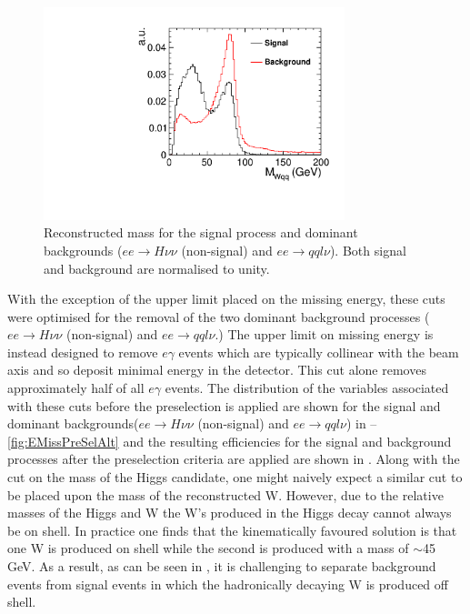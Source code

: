 \begin{figure}
  \centering
  \includegraphics[width=0.78\textwidth,keepaspectratio]{HiggsAnalysis/figures/MWqq_PreSelection}
  \caption[Reconstructed W mass for signal and background events]{Reconstructed mass for the signal process and dominant backgrounds ($ee\rightarrow H\nu\nu$ (non-signal) and $ee\rightarrow qql\nu$). Both signal and background are normalised to unity.}
  \label{fig:WMass}
\end{figure}


With the exception of the upper limit placed on the missing energy, these cuts were optimised for the removal of the two dominant background processes ($ee\rightarrow H\nu\nu$ (non-signal) and $ee\rightarrow qql\nu$.) The upper limit on missing energy is instead designed to remove $e\gamma$ events which are typically collinear with the beam axis and so deposit minimal energy in the detector. This cut alone removes approximately half of all $e\gamma$ events. The distribution of the variables associated with these cuts before the preselection is applied are shown for the signal and dominant backgrounds($ee\rightarrow H\nu\nu$ (non-signal) and $ee\rightarrow qql\nu$) in --\ref{fig:EMissPreSelAlt} and the resulting efficiencies for the signal and background processes after the preselection criteria are applied are shown in . Along with the cut on the mass of the Higgs candidate, one might naively expect a similar cut to be placed upon the mass of the reconstructed W. However, due to the relative masses of the Higgs and W the W's produced in the Higgs decay cannot always be on shell. In practice one finds that the kinematically favoured solution is that one W is produced on shell while the second is produced with a mass of $\sim$45 GeV. As a result, as can be seen in , it is challenging to separate background events from signal events in which the hadronically decaying W is produced off shell.

